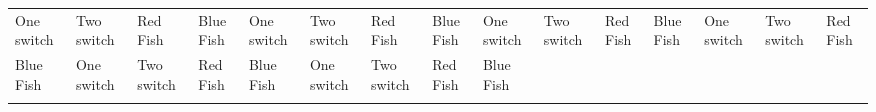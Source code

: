 \documentclass[a4paper]{article}
\begin{document}
\pagestyle{empty}
\begin{center}
\fontsize{7}{9}\selectfont
{\selectfont
\begin{tabular}{ : *{15}{C{1.2cm}:} }
\hdashline
One switch & Two switch & Red Fish & Blue Fish & One switch & Two switch & Red Fish & Blue Fish & One switch & Two switch & Red Fish & Blue Fish & One switch & Two switch & Red Fish \\ 
\hdashline
Blue Fish & One switch & Two switch & Red Fish & Blue Fish & One switch & Two switch & Red Fish & Blue Fish &  &  &  &  &  &  \\ 
\hdashline
\end{tabular}
}
\end{center}
\end{document}
